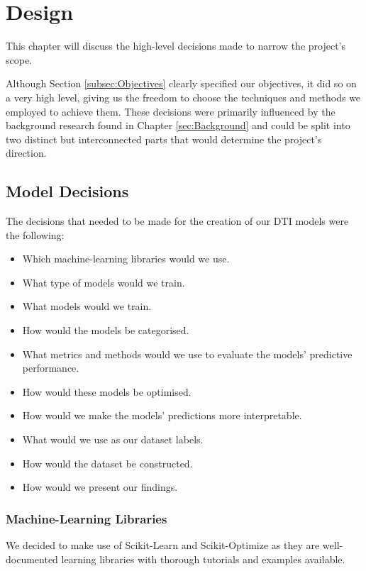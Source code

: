 \section{Design}
\label{sec:Design}

This chapter will discuss the high-level decisions made to narrow the project's scope.

Although Section \ref{subsec:Objectives} clearly specified our objectives, it did so on a very high level, giving us the freedom to choose the techniques and methods we employed to achieve them. These decisions were primarily influenced by the background research found in Chapter \ref{sec:Background} and could be split into two distinct but interconnected parts that would determine the project's direction.

\subsection{Model Decisions}

The decisions that needed to be made for the creation of our DTI models were the following:

\begin{itemize}
    \itemsep0em 
    \item
    Which machine-learning libraries would we use.
    \item
    What type of models would we train.
    \item
    What models would we train.
    \item
    How would the models be categorised.
    \item
    What metrics and methods would we use to evaluate the models' predictive performance.
    \item
    How would these models be optimised.
    \item
    How would we make the models' predictions more interpretable.
    \item
    What would we use as our dataset labels.
    \item
    How would the dataset be constructed.
    \item
    How would we present our findings.
\end{itemize}

\subsubsection{Machine-Learning Libraries}

We decided to make use of Scikit-Learn \citep{scikit-learn} and Scikit-Optimize \citep{scikit-optimize} as they are well-documented learning libraries with thorough tutorials and examples available.


